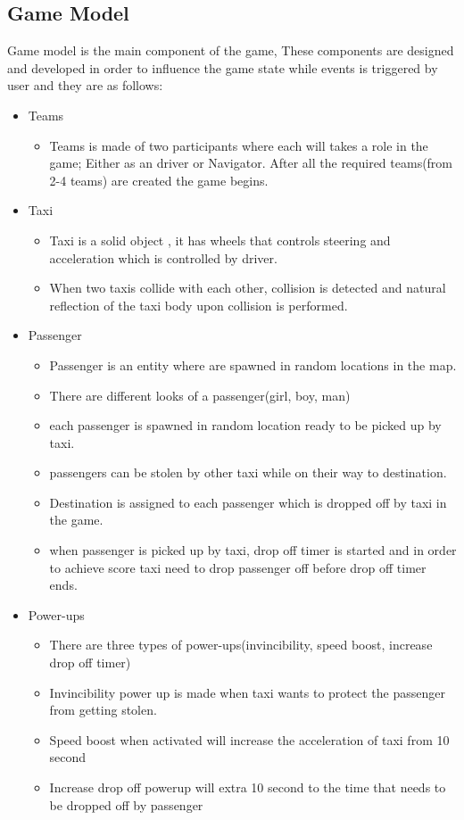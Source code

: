 \subsection*{Game Model}
	Game model is the main component of the game, These components are designed and developed in order to influence the game state while events is triggered by user and they are as follows:

\begin{itemize}
	
	\item Teams 
		\begin{itemize}
			\item  Teams is made of two participants where each will takes a role in the game; Either as an driver or Navigator. After all the required teams(from 2-4 teams) are created the game begins.
		\end{itemize}	
	\item Taxi
		\begin{itemize}
			\item Taxi is a solid object , it has wheels that controls steering and acceleration which is controlled by driver.
			\item When two taxis collide with each other, collision is detected and natural reflection of the taxi body upon collision is performed.  
		\end{itemize}	
	\item Passenger
		\begin{itemize}
			\item Passenger is an entity where are spawned in random locations in the map.
			\item There are different looks of a passenger(girl, boy, man) 
			\item each passenger is spawned in random location ready to be picked up by taxi.
			\item passengers can be stolen by other taxi while on their way to destination.
			\item Destination is assigned to each passenger which is dropped off by taxi in the game.
			\item when passenger is picked up by taxi, drop off timer is started and in order to achieve score taxi need to drop passenger off before drop off timer ends.
		\end{itemize}	
	\item Power-ups
		\begin{itemize}
			\item There are three types of power-ups(invincibility, speed boost, increase drop off timer)
			\item Invincibility power up is made when taxi wants to protect the passenger from getting stolen.
			\item Speed boost when activated will increase the acceleration of taxi from  10 second
			\item Increase drop off powerup will extra 10 second to the time that needs to be dropped off by passenger   
		\end{itemize}	
\end{itemize}

